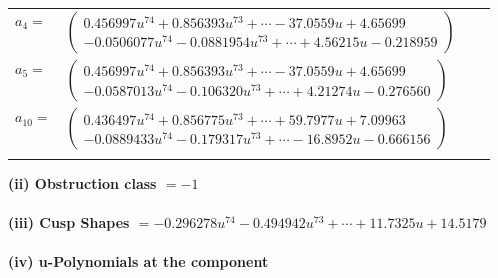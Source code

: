 \documentclass[1p]{elsarticle_modified}
\theoremstyle{definition}
\begin{document}
\begin{tabular}{m{7pt} m{180pt} m{7pt} m{180pt} }
\flushright $a_{4}=$&$\begin{pmatrix}0.456997 u^{74}+0.856393 u^{73}+\cdots-37.0559 u+4.65699\\-0.0506077 u^{74}-0.0881954 u^{73}+\cdots+4.56215 u-0.218959\end{pmatrix}$ \\
\flushright $a_{5}=$&$\begin{pmatrix}0.456997 u^{74}+0.856393 u^{73}+\cdots-37.0559 u+4.65699\\-0.0587013 u^{74}-0.106320 u^{73}+\cdots+4.21274 u-0.276560\end{pmatrix}$ \\
\flushright $a_{10}=$&$\begin{pmatrix}0.436497 u^{74}+0.856775 u^{73}+\cdots+59.7977 u+7.09963\\-0.0889433 u^{74}-0.179317 u^{73}+\cdots-16.8952 u-0.666156\end{pmatrix}$\\&\end{tabular}
\flushleft \textbf{(ii) Obstruction class $= -1$}\\~\\
\flushleft \textbf{(iii) Cusp Shapes $= -0.296278 u^{74}-0.494942 u^{73}+\cdots+11.7325 u+14.5179$}\\~\\
\newpage\renewcommand{\arraystretch}{1}
\flushleft \textbf{(iv) u-Polynomials at the component}\newline \\
\end{document}
